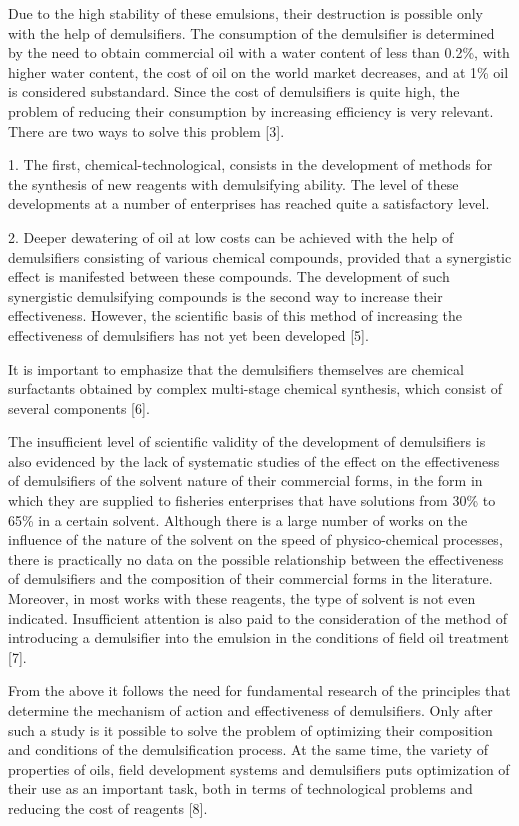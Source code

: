 Due to the high stability of these emulsions, their destruction is
possible only with the help of demulsifiers. The consumption of the
demulsifier is determined by the need to obtain commercial oil with a
water content of less than 0.2\%, with higher water content, the cost of
oil on the world market decreases, and at 1\% oil is considered
substandard. Since the cost of demulsifiers is quite high, the problem
of reducing their consumption by increasing efficiency is very relevant.
There are two ways to solve this problem {[}3{]}.

1. The first, chemical-technological, consists in the development of
methods for the synthesis of new reagents with demulsifying ability. The
level of these developments at a number of enterprises has reached quite
a satisfactory level.

2. Deeper dewatering of oil at low costs can be achieved with the help
of demulsifiers consisting of various chemical compounds, provided that
a synergistic effect is manifested between these compounds. The
development of such synergistic demulsifying compounds is the second way
to increase their effectiveness. However, the scientific basis of this
method of increasing the effectiveness of demulsifiers has not yet been
developed {[}5{]}.

It is important to emphasize that the demulsifiers themselves are
chemical surfactants obtained by complex multi-stage chemical synthesis,
which consist of several components {[}6{]}.

The insufficient level of scientific validity of the development of
demulsifiers is also evidenced by the lack of systematic studies of the
effect on the effectiveness of demulsifiers of the solvent nature of
their commercial forms, in the form in which they are supplied to
fisheries enterprises that have solutions from 30\% to 65\% in a certain
solvent. Although there is a large number of works on the influence of
the nature of the solvent on the speed of physico-chemical processes,
there is practically no data on the possible relationship between the
effectiveness of demulsifiers and the composition of their commercial
forms in the literature. Moreover, in most works with these reagents,
the type of solvent is not even indicated. Insufficient attention is
also paid to the consideration of the method of introducing a
demulsifier into the emulsion in the conditions of field oil treatment
{[}7{]}.

From the above it follows the need for fundamental research of the
principles that determine the mechanism of action and effectiveness of
demulsifiers. Only after such a study is it possible to solve the
problem of optimizing their composition and conditions of the
demulsification process. At the same time, the variety of properties of
oils, field development systems and demulsifiers puts optimization of
their use as an important task, both in terms of technological problems
and reducing the cost of reagents {[}8{]}.

